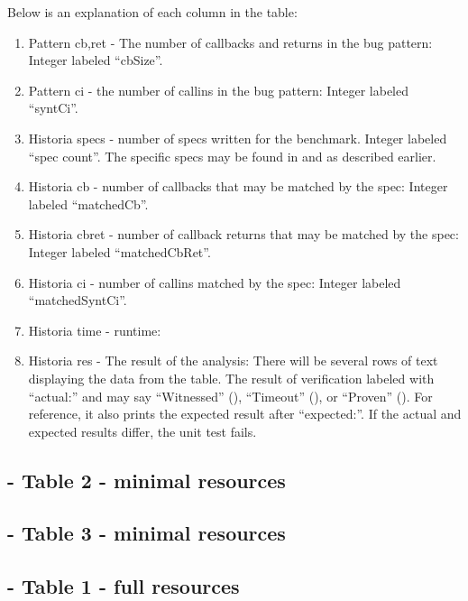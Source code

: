 \documentclass{acmart} %
\begin{document}
Below is an explanation of each column in the table:
\begin{enumerate}
    \item Pattern cb,ret - The number of callbacks and returns in the bug pattern: Integer labeled ``cbSize''.
    \item Pattern ci - the number of callins in the bug pattern: Integer labeled ``syntCi''.
    \item Historia specs - number of specs written for the benchmark.  Integer labeled ``spec count''. The specific specs may be found in  and  as described earlier.
    \item Historia cb - number of callbacks that may be matched by the \newls spec: Integer labeled ``matchedCb''.
    \item Historia cbret - number of callback returns that may be matched by the \newls spec: Integer labeled ``matchedCbRet''.
    \item Historia ci - number of callins matched by the spec: Integer labeled ``matchedSyntCi''.
    \item Historia time - runtime: 
    \item Historia res - The result of the analysis: There will be several rows of text displaying the data from the table.  The result of verification labeled with ``actual:'' and may say ``Witnessed'' (\cAlarm), ``Timeout'' (\cTimeout), or ``Proven'' (\cSafe).  For reference, it also prints the expected result after ``expected:''.  If the actual and expected results differ, the unit test fails.
\end{enumerate}




\subsection{ - Table 2 - minimal resources}

\subsection{ - Table 3 - minimal resources}

\subsection{ - Table 1 - full resources}
\end{document}
